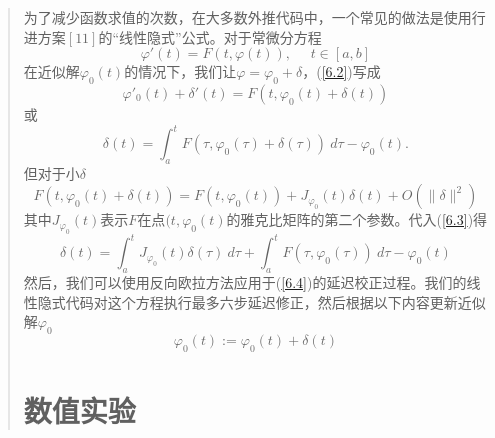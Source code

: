 \documentclass{article}
\begin{document}
\begin{CJK}{UTF8}{gkai}
\begin{quotation}
为了减少函数求值的次数，在大多数外推代码中，一个常见的做法是使用行进方案$[11]$的“线性隐式”公式。对于常微分方程\\
\begin{equation}
\varphi'(t)=F(t,\varphi(t)),~~~~~~t \in [a,b]
\label{6.2}
\end{equation}
在近似解$\varphi_0(t)$的情况下，我们让$\varphi=\varphi_0+\delta$，(\ref{6.2})写成\\
$$\varphi'_0(t)+\delta'(t)=F(t,\varphi_0(t)+\delta(t))$$
或\\
\begin{equation}
\delta(t)=\int_a^t F(\tau,\varphi_0(\tau)+\delta(\tau))~d\tau-\varphi_0(t).
\label{6.3}
\end{equation}
但对于小$\delta$\\
$$F(t,\varphi_0(t)+\delta(t))=F(t,\varphi_0(t))+J_{\varphi_0}(t) \delta(t)+O(\| \delta \|^2)$$
其中$J_{\varphi_0}(t)$表示$F$在点$(t,\varphi_0(t)$的雅克比矩阵的第二个参数。代入(\ref{6.3})得\\
\begin{equation}
\label{6.4}
\delta(t)=\int_a^t J_{\varphi_0}(t)\delta(\tau)~d\tau+ \int_a^t F(\tau,\varphi_0(\tau))~d\tau-\varphi_0(t)
\end{equation}
然后，我们可以使用反向欧拉方法应用于(\ref{6.4})的延迟校正过程。我们的线性隐式代码对这个方程执行最多六步延迟修正，然后根据以下内容更新近似解$\varphi_0$\\
$$\varphi_0(t) := \varphi_0(t)+\delta(t)$$
\section{数值实验}


\end{quotation}
\end{CJK}
\end{document}

